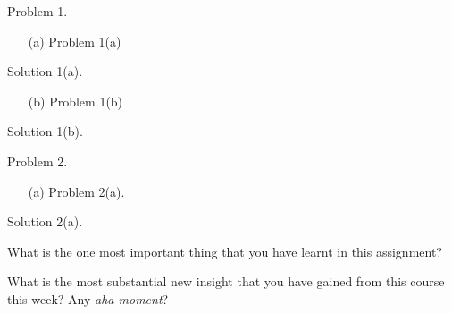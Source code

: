 




\begin{titlingpage}
	\titleGM
\end{titlingpage}
\clearpage
\setcounter{page}{1}

\begin{problem}{1}
Problem 1.

\begin{itemize}
	\item[(a)]  Problem 1(a)
\end{itemize}

\begin{solution}
Solution 1(a).
\end{solution}
\pagebreak

\begin{itemize}
	\item[(b)] Problem 1(b)
\end{itemize}

\begin{solution}
Solution 1(b).
\end{solution}
\pagebreak

\end{problem} %
\pagebreak

\begin{problem}{2}
Problem 2.

\begin{itemize}
	\item[(a)] Problem 2(a).
\end{itemize}

\begin{solution} 
Solution 2(a).
\end{solution}
\pagebreak

\end{problem} %
\pagebreak


\begin{afterword}{}
What is the one most important thing that you have learnt
in this assignment?
\vspace{0.2cm}

\TODO{}

\vspace{0.8cm}
What is the most substantial new insight that you have gained 
from this course this week? Any \textit{aha moment}?
\vspace{0.2cm}

\TODO{}

\end{afterword}

